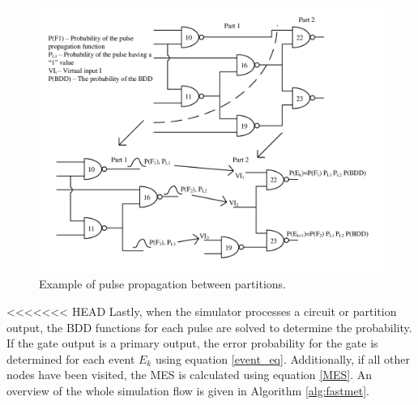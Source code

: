\documentclass[conference]{IEEEtran}
\begin{document}
\begin{figure}[!htbp]
	\centering
	\includegraphics[width=\linewidth]{Figures/PartProp}
	\caption{Example of pulse propagation between partitions.}
	\label{PART_PROP}
\end{figure}

<<<<<<< HEAD
Lastly, when the simulator processes a circuit or partition output, the BDD functions for each pulse are solved to determine the probability. If the gate output is a primary output, the error probability for the gate is determined for each event $E_k$ using equation \ref{event_eq}. Additionally, if all other nodes have been visited, the MES is calculated using equation \ref{MES}. An overview of the whole simulation flow is given in Algorithm \ref{alg:fastmet}.
\end{document}
